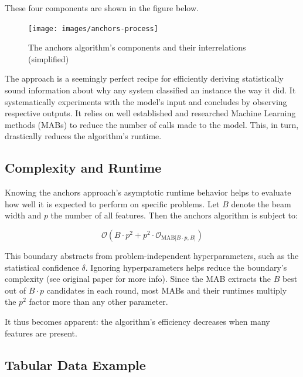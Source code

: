 \documentclass[
  11pt,
]{scrbook}
\begin{document}
These four components are shown in the figure below.

\begin{figure}

{\centering \texttt{[image: images/anchors-process]} 

}

\caption{The anchors algorithm’s components and their interrelations (simplified)}\label{fig:unnamed-chunk-30}
\end{figure}

The approach is a seemingly perfect recipe for efficiently deriving statistically sound information about why any system classified an instance the way it did. It systematically experiments with the model's input and concludes by observing respective outputs. It relies on well established and researched Machine Learning methods (MABs) to reduce the number of calls made to the model. This, in turn, drastically reduces the algorithm's runtime.

\hypertarget{complexity-and-runtime}{%
\subsection{Complexity and Runtime}\label{complexity-and-runtime}}

Knowing the anchors approach's asymptotic runtime behavior helps to evaluate how well it is expected to perform on specific problems. Let \(B\) denote the beam width and \(p\) the number of all features. Then the anchors algorithm is subject to:

\[\mathcal{O}(B\cdot{}p^2+p^2\cdot\mathcal{O}_{\textrm{MAB}\lbrack{}B\cdot{}p,B\rbrack})\]

This boundary abstracts from problem-independent hyperparameters, such as the statistical confidence \(\delta\). Ignoring hyperparameters helps reduce the boundary's complexity (see original paper for more info). Since the MAB extracts the \(B\) best out of \(B \cdot p\) candidates in each round, most MABs and their runtimes multiply the \(p^2\) factor more than any other parameter.

It thus becomes apparent: the algorithm's efficiency decreases when many features are present.

\hypertarget{tabular-data-example}{%
\subsection{Tabular Data Example}\label{tabular-data-example}}
\end{document}
